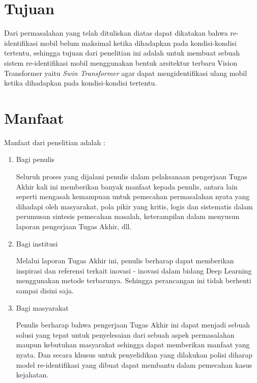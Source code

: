 \section{Tujuan}
\label{sec:Tujuan}

Dari permasalahan yang telah dituliskan diatas dapat dikatakan bahwa re-identifikasi mobil belum maksimal
ketika dihadapkan pada kondisi-kondisi tertentu, sehingga tujuan dari penelitian ini adalah untuk membuat
sebuah sistem re-identifikasi mobil menggunakan bentuk arsitektur terbaru Vision Transformer yaitu \emph{Swin Transformer} 
agar dapat mengidentifikasi ulang mobil ketika dihadapkan pada kondisi-kondisi tertentu.

\section{Manfaat}
\label{sec:manfaat}

Manfaat dari penelitian adalah :

\begin{enumerate}[nolistsep]
  
  \item Bagi penulis
  
  Seluruh proses yang dijalani penulis dalam pelaksanaan pengerjaan Tugas Akhir
  kali ini memberikan banyak manfaat kepada penulis, antara lain seperti mengasah
  kemampuan untuk pemecahan permasalahan nyata yang dihadapi oleh masyarakat,
  pola pikir yang kritis, logis dan sistematis dalam perumusan sintesis pemecahan
  masalah, keterampilan dalam menyusun laporan pengerjaan Tugas Akhir, dll.
  \item Bagi institusi
  
  Melalui laporan Tugas Akhir ini, penulis berharap dapat memberikan inspirasi dan
  referensi terkait inovasi - inovasi dalam bidang Deep Learning menggunakan metode terbarunya. Sehingga perancangan 
  ini tidak berhenti sampai disini saja.
  \item Bagi masyarakat
  
  Penulis berharap bahwa pengerjaan Tugas Akhir ini dapat menjadi sebuah solusi yang 
  tepat untuk penyelesaian dari sebuah aspek permasalahan
  maupun kebutuhan masyarakat sehingga dapat memberikan manfaat yang nyata.
  Dan secara khusus untuk penyelidikan yang dilakukan polisi diharap model re-identifikasi yang dibuat
  dapat membantu dalam pemecahan kasus kejahatan.
  
\end{enumerate}


